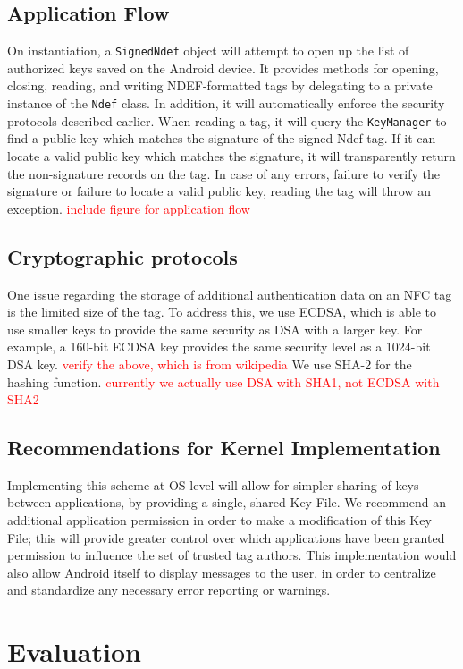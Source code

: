 \documentclass[12pt]{article}
\newcommand\TODO[1]{\textcolor{red}{#1}}
\begin{document}
\subsection{Application Flow}
On instantiation, a \texttt{SignedNdef} object will attempt to open up the list of authorized keys saved on the Android device.
It provides methods for opening, closing, reading, and writing NDEF-formatted tags by delegating to a private instance of the \texttt{Ndef} class.
In addition, it will automatically enforce the security protocols described earlier.
When reading a tag, it will query the \texttt{KeyManager} to find a public key which matches the signature of the signed Ndef tag.
If it can locate a valid public key which matches the signature, it will transparently return the non-signature records on the tag.
In case of any errors, failure to verify the signature or failure to locate a valid public key, reading the tag will throw an exception.
\TODO{include figure for application flow}

\subsection{Cryptographic protocols}
One issue regarding the storage of additional authentication data on an NFC tag is the limited size of the tag.
To address this, we use ECDSA, which is able to use smaller keys to provide the same security as DSA with a larger key.
For example, a 160-bit ECDSA key provides the same security level as a 1024-bit DSA key.
\TODO{verify the above, which is from wikipedia}
We use SHA-2 for the hashing function.
\TODO{currently we actually use DSA with SHA1, not ECDSA with SHA2}

\subsection{Recommendations for Kernel Implementation}
Implementing this scheme at OS-level will allow for simpler sharing of keys between applications, by providing a single, shared Key File.
We recommend an additional application permission in order to make a modification of this Key File; this will provide greater control over which applications have been granted permission to influence the set of trusted tag authors.
This implementation would also allow Android itself to display messages to the user, in order to centralize and standardize any necessary error reporting or warnings.



\section{Evaluation}
\end{document}
